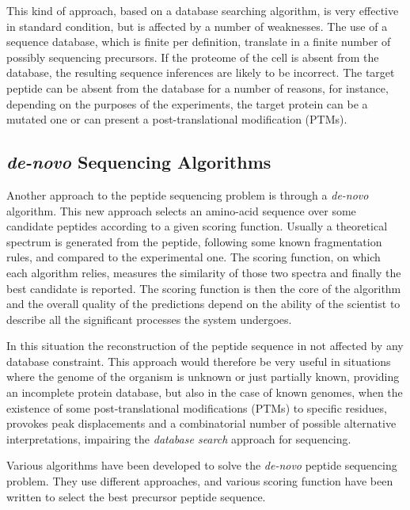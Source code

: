 This kind of approach, based on a database searching algorithm,
 is very effective in standard condition, but is affected by a
number of weaknesses. 
The use of a sequence database, which is finite per definition, translate in a
finite number of possibly sequencing precursors. 
If the proteome of the  cell is absent from the database, the resulting sequence
inferences are likely to be incorrect.
The target peptide can be absent from the database for a number of reasons, for
instance, depending on the purposes of the experiments, the target protein can
be a mutated one or can present a post-translational modification (PTMs).

\subsection{\emph{de-novo} Sequencing Algorithms}
\label{subsec:others}


Another approach to the peptide sequencing problem is through a \emph{de-novo} 
algorithm.
This new approach selects an amino-acid sequence over some candidate peptides
according to a given scoring function. Usually a theoretical spectrum is generated from
the peptide, following some known fragmentation rules, and compared to the
experimental one.
The scoring function, on which each algorithm relies, measures the
similarity of those two spectra and finally the best candidate is reported.
The scoring function is then the core of the algorithm and the overall quality
of the predictions depend on the ability of the scientist to describe all the
significant processes the system undergoes.

In this situation the reconstruction of the peptide sequence in not affected by
any database constraint. 
This approach would therefore be very useful in situations where the genome of
the organism is unknown or just partially known, providing an incomplete protein
database, but also in the case of known genomes, when the existence of some
post-translational modifications (PTMs) to specific residues, provokes peak
displacements and a combinatorial number of possible alternative
interpretations, impairing the \emph{database search} approach for sequencing.

Various algorithms have been developed to solve the \emph{de-novo} peptide
sequencing problem. 
They use different approaches, and various scoring function have been written to
select the best precursor peptide sequence.



